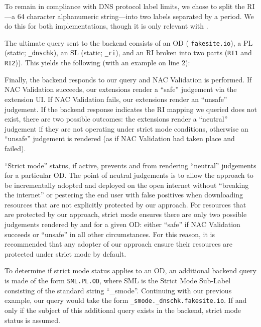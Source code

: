 To remain in compliance with DNS protocol label limits, we chose to split the
RI---a 64 character alphanumeric string---into two labels separated by a period.
We do this for both implementations, though it is only relevant with \DNSSYS{}.

The ultimate query sent to the backend consists of an OD (\eg
\texttt{fakesite.io}), a PL (static; \ie \texttt{\_dnschk}), an SL (static; \ie
\texttt{\_ri}), and an RI broken into two parts (\ie \texttt{RI1} and
\texttt{RI2})). This yields the following (with an example on line 2): \\

Finally, the backend responds to our query and NAC Validation is performed. If
NAC Validation succeeds, our extensions render a ``safe'' judgement via the
extension UI. If NAC Validation fails, our extensions render an ``unsafe''
judgement. If the backend response indicates the RI mapping we queried does not
exist, there are two possible outcomes: the extensions render a ``neutral''
judgement if they are not operating under strict mode conditions, otherwise an
``unsafe'' judgement is rendered (as if NAC Validation had taken place and
failed).

``Strict mode'' status, if active, prevents \DNSSYS{} and \DHTSYS{} from
rendering ``neutral'' judgements for a particular OD. The point of neutral
judgements is to allow the \SYSTEM{} approach to be incrementally adopted and
deployed on the open internet without ``breaking the internet'' or pestering the
end user with false positives when downloading resources that are not explicitly
protected by our approach. For resources that are protected by our approach,
strict mode ensures there are only two possible judgements rendered by \DNSSYS{}
and \DHTSYS{} for a given OD: either ``safe'' if NAC Validation succeeds or
``unsafe'' in all other circumstances. For this reason, it is recommended that
any adopter of our approach ensure their resources are protected under strict
mode by default.

To determine if strict mode status applies to an OD, an additional backend query
is made of the form \texttt{SML.PL.OD}, where SML is the Strict Mode Sub-Label
consisting of the standard string ``\_smode''. Continuing with our previous
example, our query would take the form \texttt{\_smode.\_dnschk.fakesite.io}. If
and only if the subject of this additional query exists in the backend, strict
mode status is assumed.

